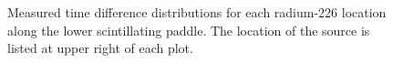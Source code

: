 \begin{figure}
\caption{\label{dists} Measured time difference distributions for each radium-226 location along the lower scintillating paddle. The location of the source is listed at upper right of each plot. }
\end{figure}

